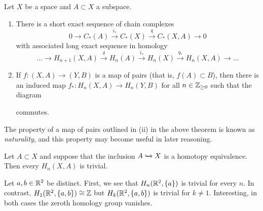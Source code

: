 \begin{theorem}
  Let $X$ be a space and $A \subset X$ a subspace.
  \begin{enumerate}
    \item There is a short exact sequence of chain complexes
          \[ 0 \to C_*(A) \xrightarrow{i_*} C_*(X) \xrightarrow{q} C_*(X,A) \to 0\]
          with associated long exact sequence in homology
          \[\ldots \to H_{n+1}(X,A) \xrightarrow\delta H_n(A) \xrightarrow{i_*} H_n(X) \xrightarrow{q_*} H_n(X,A) \to \ldots\]

    \item If $f: (X,A) \to (Y,B)$ is a map of pairs (that is, $f(A) \subset B$), then there is an induced map $f_*: H_n(X,A) \to H_n(Y, B)$ for all $n \in \mathbb{Z}_{\geq 0}$ such that the diagram
    

          commutes.
  \end{enumerate}
\end{theorem}

The property of a map of pairs outlined in (ii) in the above theorem is known as \emph{naturality}, and this property may become useful in later reasoning. 

\begin{example}
  Let $A \subset X$ and suppose that the inclusion $A \xhookrightarrow{} X$ is a homotopy equivalence. Then every $H_n(X,A)$ is trivial. 
\end{example}
\begin{example}
  Let $a, b \in \mathbb{R}^2$ be distinct. First, we see that $H_n(\mathbb{R}^2, \{a\})$ is trivial for every $n$. In contrast, $H_1(\mathbb{R}^2, \{a,b\}) \cong \mathbb{Z}$ but $H_k(\mathbb{R}^2, \{a,b\})$ is trivial for $k\neq 1$. Interesting, in both cases the zeroth homology group vanishes. 
\end{example}

